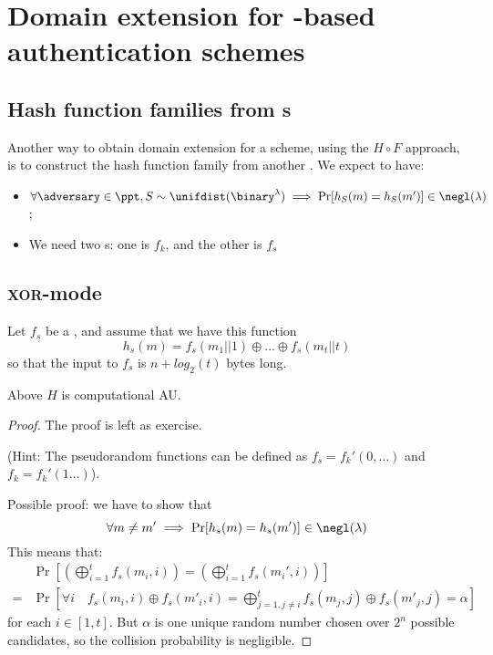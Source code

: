 
\section{Domain extension for \prf-based authentication schemes}

\subsection{Hash function families from \prf{}s}

Another way to obtain domain extension for a \mac{} scheme, using the $H \circ F$ approach, is to construct the hash function family from another \prf{}. We expect to have:
\begin{itemize}
    \item $\forall \adversary \in \ppt, S \sim \unifdist(\binary^\lambda) \implies \Pr[h_S(m) = h_S(m')] \in \negl(\lambda)$;
    \item We need two \prf{}s: one is $f_k$, and the other is $f_s$
\end{itemize}

\subsection{\textsc{xor}-mode}

Let $f_s$ be a \prf, and assume that we have this function
\[
    h_s(m) = f_s(m_1||1) \oplus ... \oplus f_s(m_t||t)
\]
so that the input to $f_s$ is $n + log_2(t)$ bytes long.

\begin{lemma}
    Above $H$ is computational \textsc{AU}.
\end{lemma}

\begin{proof} The proof is left as exercise.

    (Hint: The pseudorandom functions can be defined as $f_s = f_k'(0, \dots)$ and $f_k = f_k'(1 \dots)$).
    
    Possible proof: we have to show that
    \[
        \forall m \neq m' \implies \Pr[h_s(m) = h_s(m')] \in \negl(\lambda)   
    \]
    This means that:
    \begin{align*}
        & \Pr\left[\left(\bigoplus_{i = 1}^{t} f_s(m_i, i)\right) = \left(\bigoplus_{i = 1}^{t} f_s(m_i', i)\right)\right] \\
        =& \Pr[\forall i \quad f_s(m_i, i) \oplus f_s(m'_i, i) = \bigoplus_{j = 1, j \neq i}^{t} f_s(m_j, j) \oplus f_s(m'_j, j) = \alpha]
    \end{align*}
    for each $i \in [1,t]$. But $\alpha$ is one unique random number chosen over $2^{n}$ possible candidates, so the collision probability is negligible.
    
\end{proof}

